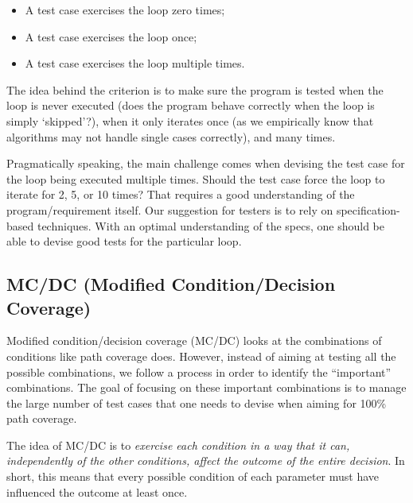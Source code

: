 \begin{itemize}
\tightlist
\item
  A test case exercises the loop zero times;
\item
  A test case exercises the loop once;
\item
  A test case exercises the loop multiple times.
\end{itemize}

The idea behind the criterion is to make sure the program is tested when
the loop is never executed (does the program behave correctly when the
loop is simply `skipped'?), when it only iterates once (as we
empirically know that algorithms may not handle single cases correctly),
and many times.

Pragmatically speaking, the main challenge comes when devising the test
case for the loop being executed multiple times. Should the test case
force the loop to iterate for 2, 5, or 10 times? That requires a good
understanding of the program/requirement itself. Our suggestion for
testers is to rely on specification-based techniques. With an optimal
understanding of the specs, one should be able to devise good tests for
the particular loop.

\hypertarget{mcdc-modified-conditiondecision-coverage}{%
\subsection{MC/DC (Modified Condition/Decision
Coverage)}\label{mcdc-modified-conditiondecision-coverage}}

Modified condition/decision coverage (MC/DC) looks at the combinations
of conditions like path coverage does. However, instead of aiming at
testing all the possible combinations, we follow a process in order to
identify the ``important'' combinations. The goal of focusing on these
important combinations is to manage the large number of test cases that
one needs to devise when aiming for 100\% path coverage.

The idea of MC/DC is to \emph{exercise each condition in a way that it
can, independently of the other conditions, affect the outcome of the
entire decision}. In short, this means that every possible condition of
each parameter must have influenced the outcome at least once.


